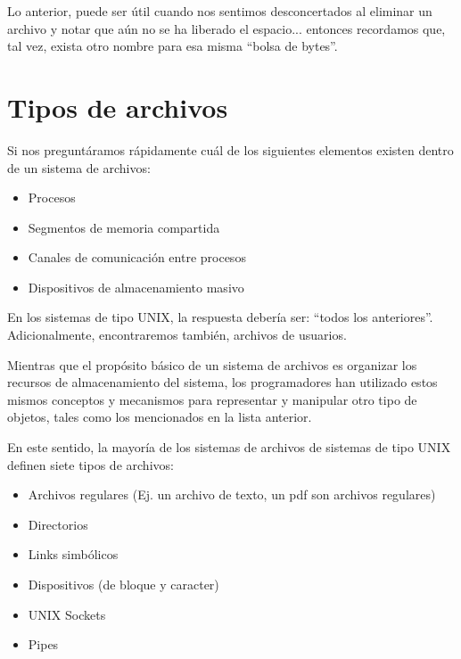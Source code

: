 \documentclass[12pt]{article}
\begin{document}

Lo anterior, puede ser útil cuando nos sentimos desconcertados al eliminar un 
archivo y notar que aún no se ha liberado el espacio... entonces recordamos que,
tal vez, exista otro nombre para esa misma ``bolsa de bytes''.

\section*{Tipos de archivos}
Si nos preguntáramos rápidamente cuál de los siguientes elementos existen 
dentro de un sistema de archivos: 
\begin{itemize}
\item Procesos 
\item Segmentos de memoria compartida
\item Canales de comunicación entre procesos
\item Dispositivos de almacenamiento masivo 
\end{itemize}

En los sistemas de tipo UNIX, la respuesta debería ser: ``todos los 
anteriores''. Adicionalmente, encontraremos también, archivos de usuarios. 

Mientras que el propósito básico de un sistema de archivos es organizar 
los recursos de almacenamiento del  sistema, los programadores han utilizado
estos mismos conceptos y mecanismos para representar y manipular otro tipo 
de objetos, tales como los mencionados en la lista anterior. 

En este sentido, la mayoría de los sistemas de archivos de sistemas de 
tipo UNIX definen siete tipos de archivos:

\begin{itemize}
\item Archivos regulares (Ej. un archivo de texto, un pdf son archivos regulares)
\item Directorios
\item Links simbólicos
\item Dispositivos (de bloque y caracter) 
\item UNIX Sockets  
\item Pipes 
\end{itemize}
\end{document}
